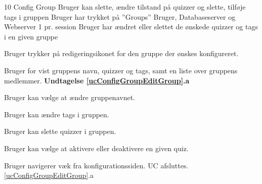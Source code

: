 \uchead
	{10} %
	{Config Group} %
	{Bruger kan slette, ændre tilstand på quizzer og slette, tilføje tags i gruppen} %
	{Bruger har trykket på ''Groups''} %
	{Bruger, Databaseserver og Webserver} %
	{} %
	{1 pr. session} %
	{Bruger har ændret eller slettet de ønskede quizzer og tags i en given gruppe} %


\item Bruger trykker på redigeringsikonet for den gruppe der ønskes konfigureret.

\item\label{ucConfigGroupEditGroup} Bruger for vist gruppens navn, quizzer og tags, samt en liste over gruppens medlemmer. 
\textbf{Undtagelse \ref{ucConfigGroupEditGroup}.a}

\item Bruger kan vælge at ændre gruppenavnet.

\item Bruger kan ændre tags i gruppen.

\item Bruger kan slette quizzer i gruppen.

\item Bruger kan vælge at aktivere eller deaktivere en given quiz.


\ucdescriptionend %

\ucextension
	{Bruger navigerer væk fra konfigurationssiden.}
	{UC afsluttes.}
	{\ref{ucConfigGroupEditGroup}.a}

